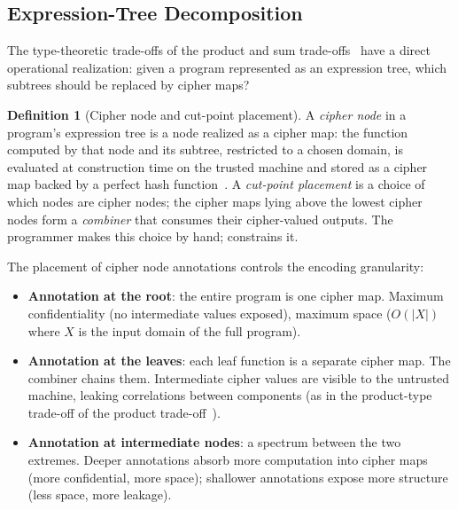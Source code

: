 \documentclass[11pt]{article}
\theoremstyle{definition}
\newtheorem{definition}{Definition}[section]
\theoremstyle{plain}
\theoremstyle{remark}
\begin{document}
\subsection{Expression-Tree Decomposition}
\label{sec:cipher-programs}

The type-theoretic trade-offs of the product and sum trade-offs~\cite{towell2026algebraic} have a
direct operational realization: given a program represented as an
expression tree, which subtrees should be replaced by cipher maps?

\begin{definition}[Cipher node and cut-point placement]
\label{def:cipher-node}
A \emph{cipher node} in a program's expression tree is a node realized
as a cipher map: the function computed by that node and its subtree,
restricted to a chosen domain, is evaluated at construction time on the
trusted machine and stored as a cipher map backed by a perfect hash
function~\cite{fredman1984storing}.
A \emph{cut-point placement} is a choice of which nodes are cipher
nodes; the cipher maps lying above the lowest cipher nodes form a
\emph{combiner} that consumes their cipher-valued outputs.
The programmer makes this choice by hand; 
constrains it.
\end{definition}

The placement of cipher node annotations controls the encoding
granularity:

\begin{itemize}
\item \textbf{Annotation at the root}: the entire program is one cipher
  map.  Maximum confidentiality (no intermediate values exposed), maximum
  space ($O(|X|)$ where $X$ is the input domain of the full program).
\item \textbf{Annotation at the leaves}: each leaf function is a
  separate cipher map.  The combiner chains them.  Intermediate cipher
  values are visible to the untrusted machine, leaking correlations
  between components (as in the product-type trade-off of
  the product trade-off~\cite{towell2026algebraic}).
\item \textbf{Annotation at intermediate nodes}: a spectrum between the
  two extremes.  Deeper annotations absorb more computation into cipher
  maps (more confidential, more space); shallower annotations expose
  more structure (less space, more leakage).
\end{itemize}
\end{document}
